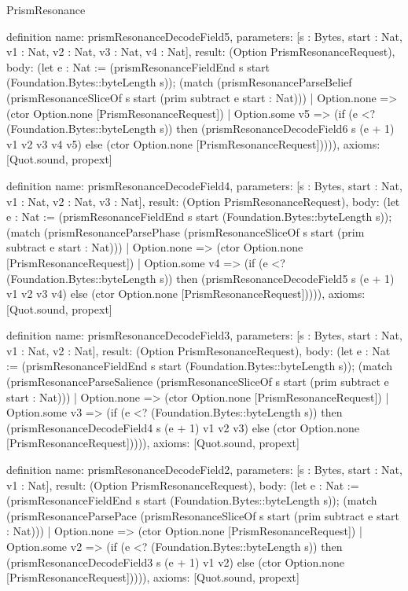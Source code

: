 \begin{lexlean}{PrismResonance}
\begin{semanticmodule}
definition{
  name: prismResonanceDecodeField5,
  parameters: [s : Bytes, start : Nat, v1 : Nat, v2 : Nat, v3 : Nat, v4 : Nat],
  result: (Option PrismResonanceRequest),
  body: (let e : Nat := (prismResonanceFieldEnd s start (Foundation.Bytes::byteLength s)); (match (prismResonanceParseBelief (prismResonanceSliceOf s start (prim subtract e start : Nat)))
    | Option.none => (ctor Option.none [PrismResonanceRequest])
    | Option.some v5 => (if (e <? (Foundation.Bytes::byteLength s)) then (prismResonanceDecodeField6 s (e + 1) v1 v2 v3 v4 v5) else (ctor Option.none [PrismResonanceRequest])))),
  axioms: [Quot.sound, propext]
}

definition{
  name: prismResonanceDecodeField4,
  parameters: [s : Bytes, start : Nat, v1 : Nat, v2 : Nat, v3 : Nat],
  result: (Option PrismResonanceRequest),
  body: (let e : Nat := (prismResonanceFieldEnd s start (Foundation.Bytes::byteLength s)); (match (prismResonanceParsePhase (prismResonanceSliceOf s start (prim subtract e start : Nat)))
    | Option.none => (ctor Option.none [PrismResonanceRequest])
    | Option.some v4 => (if (e <? (Foundation.Bytes::byteLength s)) then (prismResonanceDecodeField5 s (e + 1) v1 v2 v3 v4) else (ctor Option.none [PrismResonanceRequest])))),
  axioms: [Quot.sound, propext]
}

definition{
  name: prismResonanceDecodeField3,
  parameters: [s : Bytes, start : Nat, v1 : Nat, v2 : Nat],
  result: (Option PrismResonanceRequest),
  body: (let e : Nat := (prismResonanceFieldEnd s start (Foundation.Bytes::byteLength s)); (match (prismResonanceParseSalience (prismResonanceSliceOf s start (prim subtract e start : Nat)))
    | Option.none => (ctor Option.none [PrismResonanceRequest])
    | Option.some v3 => (if (e <? (Foundation.Bytes::byteLength s)) then (prismResonanceDecodeField4 s (e + 1) v1 v2 v3) else (ctor Option.none [PrismResonanceRequest])))),
  axioms: [Quot.sound, propext]
}

definition{
  name: prismResonanceDecodeField2,
  parameters: [s : Bytes, start : Nat, v1 : Nat],
  result: (Option PrismResonanceRequest),
  body: (let e : Nat := (prismResonanceFieldEnd s start (Foundation.Bytes::byteLength s)); (match (prismResonanceParsePace (prismResonanceSliceOf s start (prim subtract e start : Nat)))
    | Option.none => (ctor Option.none [PrismResonanceRequest])
    | Option.some v2 => (if (e <? (Foundation.Bytes::byteLength s)) then (prismResonanceDecodeField3 s (e + 1) v1 v2) else (ctor Option.none [PrismResonanceRequest])))),
  axioms: [Quot.sound, propext]
}


\end{semanticmodule}
\end{lexlean}
